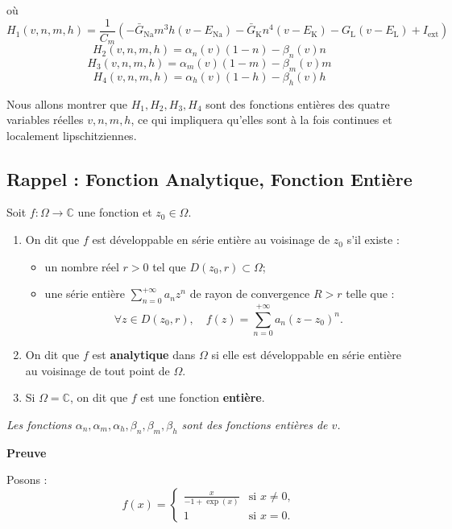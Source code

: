 	où
	\[
	H_1(v, n, m, h) = \frac{1}{C_m}(-\bar{G}_{\text{Na}} m^3 h (v - E_{\text{Na}}) - \bar{G}_{\text{K}} n^4 (v - E_{\text{K}}) - G_{\text{L}} (v - E_{\text{L}}) + I_{\text{ext}})
	\]
	\[
	H_2(v, n, m, h) = \alpha_n(v)(1 - n) - \beta_n(v)n
	\]
	\[
	H_3(v, n, m, h) = \alpha_m(v)(1 - m) - \beta_m(v)m
	\]
	\[
	H_4(v, n, m, h) = \alpha_h(v)(1 - h) - \beta_h(v)h
	\]

	Nous allons montrer que $H_1, H_2, H_3, H_4$ sont des fonctions entières des quatre variables réelles $v, n, m, h$, ce qui impliquera qu'elles sont à la fois continues et localement lipschitziennes.
	
\subsection*{Rappel : Fonction Analytique, Fonction Entière}
	\begin{definition}
	Soit $f : \Omega \to \mathbb{C}$ une fonction et $z_0 \in \Omega$.
		\begin{enumerate}
			\item On dit que $f$ est développable en série entière au voisinage de $z_0$ s'il existe :
			\begin{itemize}
				\item un nombre réel $r > 0$ tel que $D(z_0, r) \subset \Omega$;
				\item une série entière $\sum_{n=0}^{+\infty} a_n z^n$ de rayon de convergence $R > r$ telle que :
				\[
				\forall z \in D(z_0, r), \quad f(z) = \sum_{n=0}^{+\infty} a_n (z - z_0)^n.
				\]
			\end{itemize}
			\item On dit que $f$ est \textbf{analytique} dans $\Omega$ si elle est développable en série entière au voisinage de tout point de $\Omega$.
			\item Si $\Omega=\mathbb{C}$, on dit que $f$ est une fonction \textbf{entière}.
		\end{enumerate}
	\end{definition}

	\begin{proposition}
		\textit{Les fonctions $\alpha_n, \alpha_m, \alpha_h, \beta_n, \beta_m, \beta_h$ sont des fonctions entières de $v$.}    
	\end{proposition}
	
	\textbf{Preuve}
	
	Posons :
	\[
	f(x) = 
	\begin{cases}
	\frac{x}{-1 + \exp(x)} & \text{si } x \neq 0, \\
	1 & \text{si } x = 0.
	\end{cases}
	\]
	
